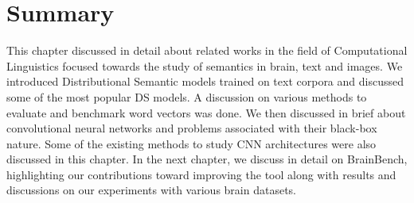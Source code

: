 \section{Summary}

This chapter discussed in detail about related works in the field of Computational Linguistics focused towards the study of semantics in brain, text and images. We introduced Distributional Semantic models trained on text corpora and discussed some of the most popular DS models. A discussion on various methods to evaluate and benchmark word vectors was done. We then discussed in brief about convolutional neural networks and problems associated with their black-box nature. Some of the existing methods to study CNN architectures were also discussed in this chapter. In the next chapter, we discuss in detail on BrainBench, highlighting our contributions toward improving the tool along with results and discussions on our experiments with various brain datasets.







